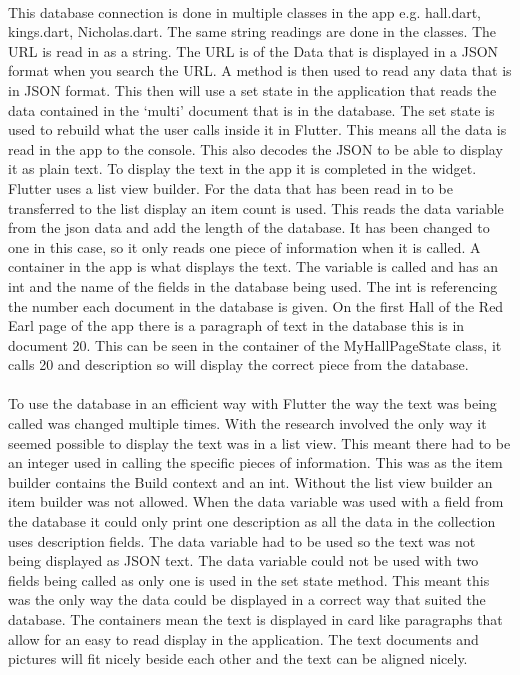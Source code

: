 \paragraph{}This database connection is done in multiple classes in the app e.g. hall.dart, kings.dart, Nicholas.dart. The same string readings are done in the classes. The URL is read in as a string. The URL is of the Data that is displayed in a JSON format when you search the URL.  A method is then used to read any data that is in JSON format. This then will use a set state in the application that reads the data contained in the ‘multi’ document that is in the database. The set state is used to rebuild what the user calls inside it in Flutter.  This means all the data is read in the app to the console. This also decodes the JSON to be able to display it as plain text. To display the text in the app it is completed in the widget. Flutter uses a list view builder. For the data that has been read in to be transferred to the list display an item count is used. This reads the data variable from the json data and add the length of the database. It has been changed to one in this case, so it only reads one piece of information when it is called. A container in the app is what displays the text. The variable is called and has an int and the name of the fields in the database being used. The int is referencing the number each document in the database is given. On the first Hall of the Red Earl page of the app there is a paragraph of text in the database this is in document 20. This can be seen in the container of the MyHallPageState class, it calls 20 and description so will display the correct piece from the database.
\paragraph{}To use the database in an efficient way with Flutter the way the text was being called was changed multiple times. With the research involved the only way it seemed possible to display the text was in a list view. This meant there had to be an integer used in calling the specific pieces of information. This was as the item builder contains the Build context and an int.  Without the list view builder an item builder was not allowed. When the data variable was used with a field from the database it could only print one description as all the data in the collection uses description fields. The data variable had to be used so the text was not being displayed as JSON text.  The data variable could not be used with two fields being called as only one is used in the set state method. This meant this was the only way the data could be displayed in a correct way that suited the database. The containers mean the text is displayed in card like paragraphs that allow for an easy to read display in the application. The text documents and pictures will fit nicely beside each other and the text can be aligned nicely. 

